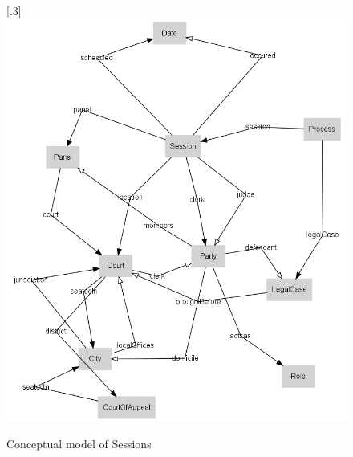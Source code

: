 \documentclass[10pt,a4paper]{report}              %
\theoremstyle{plain}\theorembodyfont{\rmfamily}\newtheorem{definition}{Definition}[section]
\theoremstyle{plain}\theorembodyfont{\rmfamily}\newtheorem{designrule}[definition]{Requirement}
\begin{document}
\begin{figure}[htb]
\begin{center}
\scalebox{.3}[.3]{\includegraphics{PatSessions}}
\caption{Conceptual model of Sessions}
\label{fig:PatSessions}
\end{center}
\end{figure}
\end{document}
